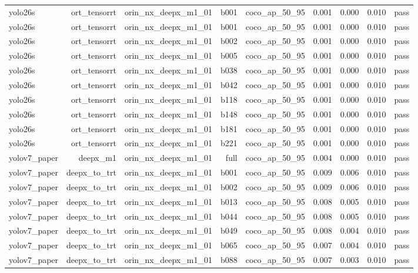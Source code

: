 \begin{table}[t]
\begin{tabular}{lrrrrrrrr}
yolo26s & ort\_tensorrt & orin\_nx\_deepx\_m1\_01 & b001 & coco\_ap\_50\_95 & 0.001 & 0.000 & 0.010 & pass \\
yolo26s & ort\_tensorrt & orin\_nx\_deepx\_m1\_01 & b001 & coco\_ap\_50\_95 & 0.001 & 0.000 & 0.010 & pass \\
yolo26s & ort\_tensorrt & orin\_nx\_deepx\_m1\_01 & b002 & coco\_ap\_50\_95 & 0.001 & 0.000 & 0.010 & pass \\
yolo26s & ort\_tensorrt & orin\_nx\_deepx\_m1\_01 & b005 & coco\_ap\_50\_95 & 0.001 & 0.000 & 0.010 & pass \\
yolo26s & ort\_tensorrt & orin\_nx\_deepx\_m1\_01 & b038 & coco\_ap\_50\_95 & 0.001 & 0.000 & 0.010 & pass \\
yolo26s & ort\_tensorrt & orin\_nx\_deepx\_m1\_01 & b042 & coco\_ap\_50\_95 & 0.001 & 0.000 & 0.010 & pass \\
yolo26s & ort\_tensorrt & orin\_nx\_deepx\_m1\_01 & b118 & coco\_ap\_50\_95 & 0.001 & 0.000 & 0.010 & pass \\
yolo26s & ort\_tensorrt & orin\_nx\_deepx\_m1\_01 & b148 & coco\_ap\_50\_95 & 0.001 & 0.000 & 0.010 & pass \\
yolo26s & ort\_tensorrt & orin\_nx\_deepx\_m1\_01 & b181 & coco\_ap\_50\_95 & 0.001 & 0.000 & 0.010 & pass \\
yolo26s & ort\_tensorrt & orin\_nx\_deepx\_m1\_01 & b221 & coco\_ap\_50\_95 & 0.001 & 0.000 & 0.010 & pass \\
yolov7\_paper & deepx\_m1 & orin\_nx\_deepx\_m1\_01 & full & coco\_ap\_50\_95 & 0.004 & 0.000 & 0.010 & pass \\
yolov7\_paper & deepx\_to\_trt & orin\_nx\_deepx\_m1\_01 & b001 & coco\_ap\_50\_95 & 0.009 & 0.006 & 0.010 & pass \\
yolov7\_paper & deepx\_to\_trt & orin\_nx\_deepx\_m1\_01 & b002 & coco\_ap\_50\_95 & 0.009 & 0.006 & 0.010 & pass \\
yolov7\_paper & deepx\_to\_trt & orin\_nx\_deepx\_m1\_01 & b013 & coco\_ap\_50\_95 & 0.008 & 0.005 & 0.010 & pass \\
yolov7\_paper & deepx\_to\_trt & orin\_nx\_deepx\_m1\_01 & b044 & coco\_ap\_50\_95 & 0.008 & 0.005 & 0.010 & pass \\
yolov7\_paper & deepx\_to\_trt & orin\_nx\_deepx\_m1\_01 & b049 & coco\_ap\_50\_95 & 0.008 & 0.004 & 0.010 & pass \\
yolov7\_paper & deepx\_to\_trt & orin\_nx\_deepx\_m1\_01 & b065 & coco\_ap\_50\_95 & 0.007 & 0.004 & 0.010 & pass \\
yolov7\_paper & deepx\_to\_trt & orin\_nx\_deepx\_m1\_01 & b088 & coco\_ap\_50\_95 & 0.007 & 0.003 & 0.010 & pass \\

\end{tabular}
\end{table}
